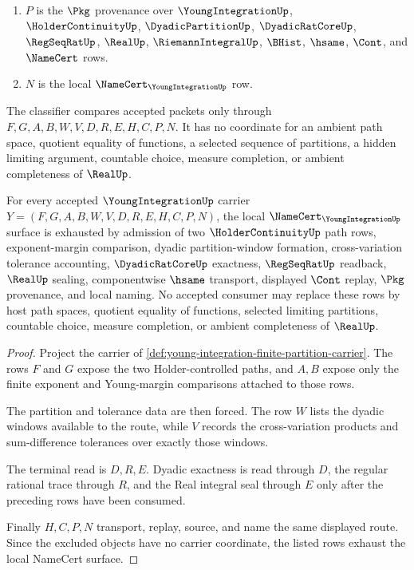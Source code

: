 \begin{definition}
\begin{enumerate}
\item $P$ is the $\Pkg$ provenance over $\YoungIntegrationUp$, $\HolderContinuityUp$, $\DyadicPartitionUp$, $\DyadicRatCoreUp$, $\RegSeqRatUp$, $\RealUp$, $\RiemannIntegralUp$, $\BHist$, $\hsame$, $\Cont$, and $\NameCert$ rows.
\item $N$ is the local $\NameCert_{\YoungIntegrationUp}$ row.
\end{enumerate}
The classifier compares accepted packets only through $F,G,A,B,W,V,D,R,E,H,C,P,N$. It has no coordinate for an ambient path space, quotient equality of functions, a selected sequence of partitions, a hidden limiting argument, countable choice, measure completion, or ambient completeness of $\RealUp$.
\end{definition}

\begin{theorem}
\label{thm:young-integration-namecert-obligations}
For every accepted $\YoungIntegrationUp$ carrier $Y=(F,G,A,B,W,V,D,R,E,H,C,P,N)$, the local $\NameCert_{\YoungIntegrationUp}$ surface is exhausted by admission of two $\HolderContinuityUp$ path rows, exponent-margin comparison, dyadic partition-window formation, cross-variation tolerance accounting, $\DyadicRatCoreUp$ exactness, $\RegSeqRatUp$ readback, $\RealUp$ sealing, componentwise $\hsame$ transport, displayed $\Cont$ replay, $\Pkg$ provenance, and local naming. No accepted consumer may replace these rows by host path spaces, quotient equality of functions, selected limiting partitions, countable choice, measure completion, or ambient completeness of $\RealUp$.
\end{theorem}
\begin{proof}
Project the carrier of \autoref{def:young-integration-finite-partition-carrier}. The rows $F$ and $G$ expose the two Holder-controlled paths, and $A,B$ expose only the finite exponent and Young-margin comparisons attached to those rows.

The partition and tolerance data are then forced. The row $W$ lists the dyadic windows available to the route, while $V$ records the cross-variation products and sum-difference tolerances over exactly those windows.

The terminal read is $D,R,E$. Dyadic exactness is read through $D$, the regular rational trace through $R$, and the Real integral seal through $E$ only after the preceding rows have been consumed.

Finally $H,C,P,N$ transport, replay, source, and name the same displayed route. Since the excluded objects have no carrier coordinate, the listed rows exhaust the local NameCert surface.
\end{proof}

